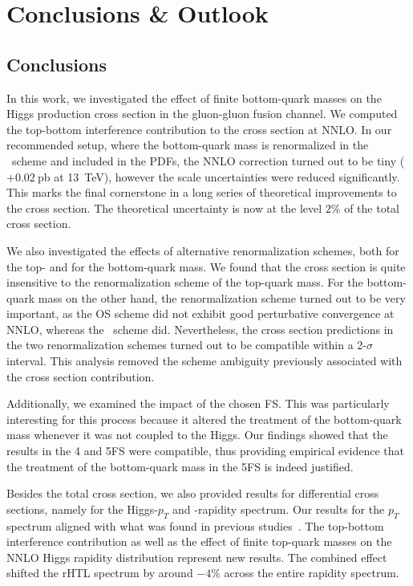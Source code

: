 

\chapter{Conclusions \& Outlook}\label{chap:seven}
\section{Conclusions}
In this work, we investigated the effect of finite bottom-quark masses on the Higgs production cross section in the gluon-gluon fusion channel. We computed the top-bottom interference contribution to the cross section at \acs{NNLO}. In our recommended setup, where the bottom-quark mass is renormalized in the \MS\ scheme and included in the \acs{PDF}s, the \acs{NNLO} correction turned out to be tiny ($+0.02\ \mathrm{pb}$ at 13~TeV), however the scale uncertainties were reduced significantly. This marks the final cornerstone in a long series of theoretical improvements to the cross section. The theoretical uncertainty is now at the level $2\%$ of the total cross section.

We also investigated the effects of alternative renormalization schemes, both for the top- and for the bottom-quark mass. We found that the cross section is quite insensitive to the renormalization scheme of the top-quark mass. For the bottom-quark mass on the other hand, the renormalization scheme turned out to be very important, as the \acs{OS} scheme did not exhibit good perturbative convergence at \acs{NNLO}, whereas the \MS\ scheme did. Nevertheless, the cross section predictions in the two renormalization schemes turned out to be compatible within a 2-$\sigma$ interval. This analysis removed the scheme ambiguity previously associated with the cross section contribution.

Additionally, we examined the impact of the chosen \acs{FS}. This was particularly interesting for this process because it altered the treatment of the bottom-quark mass whenever it was not coupled to the Higgs. Our findings showed that the results in the 4 and 5\acs{FS} were compatible, thus providing empirical evidence that the treatment of the bottom-quark mass in the 5\acs{FS} is indeed justified.

Besides the total cross section, we also provided results for differential cross sections, namely for the Higgs-$p_T$ and -rapidity spectrum. Our results for the $p_T$ spectrum aligned with what was found in previous studies~\cite{Caola:2018zye,Bonciani:2022jmb}. The top-bottom interference contribution as well as the effect of finite top-quark masses on the \acs{NNLO} Higgs rapidity distribution represent new results. The combined effect shifted the \acs{rHTL} spectrum by around $-4\%$ across the entire rapidity spectrum.


